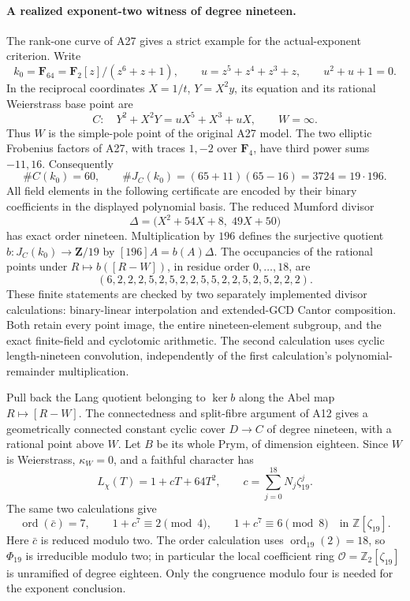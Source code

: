 \documentclass[11pt,a4paper]{article}
\begin{document}
\paragraph{A realized exponent-two witness of degree nineteen.}
The rank-one curve of A27 gives a strict example for the
actual-exponent criterion. Write
\[
 k_0=\mathbf F_{64}=\mathbf F_2[z]/(z^6+z+1),\qquad
 u=z^5+z^4+z^3+z,
 \qquad u^2+u+1=0.
\]
In the reciprocal coordinates $X=1/t$, $Y=X^2y$, its equation
and its rational Weierstrass base point are
\[
 C:\quad Y^2+X^2Y=uX^5+X^3+uX,
              \qquad W=\infty.
 \tag{BE.14}
\]
Thus $W$ is the simple-pole point of the original A27 model.
The two elliptic Frobenius factors of A27, with traces $1,-2$
over $\mathbf F_4$, have third power sums $-11,16$.
Consequently
\[
 \#C(k_0)=60,\qquad
 \#J_C(k_0)=(65+11)(65-16)=3724=19\cdot196.
 \tag{BE.15}
\]
All field elements in the following certificate are encoded
by their binary coefficients in the displayed polynomial basis.
The reduced Mumford divisor
\[
 \Delta=\bigl(X^2+54X+8,\;49X+50\bigr)
 \tag{BE.16}
\]
has exact order nineteen. Multiplication by $196$ defines
the surjective quotient $b:J_C(k_0)\to\mathbf Z/19$ by
$[196]A=b(A)\Delta$. The occupancies of the rational points
under $R\mapsto b([R-W])$, in residue order $0,\ldots,18$, are
\[
 (6,2,2,2,5,2,5,2,2,5,5,2,2,5,2,5,2,2,2).
 \tag{BE.17}
\]
These finite statements are checked by two separately
implemented divisor calculations: binary-linear interpolation
and extended-GCD Cantor composition. Both retain every point
image, the entire nineteen-element subgroup, and the exact
finite-field and cyclotomic arithmetic. The second calculation
uses cyclic length-nineteen convolution, independently of the
first calculation's polynomial-remainder multiplication.

Pull back the Lang quotient belonging to $\ker b$ along the
Abel map $R\mapsto[R-W]$. The connectedness and split-fibre
argument of A12 gives a geometrically connected constant
cyclic cover $D\to C$ of degree nineteen, with a rational
point above $W$. Let $B$ be its whole Prym, of dimension
eighteen. Since $W$ is Weierstrass, $\kappa_W=0$, and a
faithful character has
\[
 L_\chi(T)=1+cT+64T^2,
      \qquad c=\sum_{j=0}^{18}N_j\zeta_{19}^j.
 \tag{BE.18}
\]
The same two calculations give
\[
 \operatorname{ord}(\bar c)=7,
 \qquad 1+c^7\equiv2\pmod4,
 \qquad 1+c^7\equiv6\pmod8
 \quad\text{in }\mathbb Z[\zeta_{19}].
 \tag{BE.19}
\]
Here $\bar c$ is reduced modulo two. The order calculation
uses $\operatorname{ord}_{19}(2)=18$, so $\Phi_{19}$ is
irreducible modulo two; in particular the local coefficient
ring $\mathcal O=\mathbb Z_2[\zeta_{19}]$ is unramified of
degree eighteen. Only the congruence modulo four is needed
for the exponent conclusion.
\end{document}
